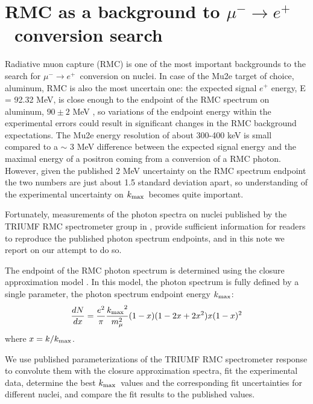 \documentclass[12pt]{article}
\newcommand {\kmax}         {\mbox{$k_{\rm max}$}}
\newcommand {\MuMinusEPlus} {\mbox{$\mu^- \rightarrow e^+$}}
\begin{document}
\section{ RMC as a background to \MuMinusEPlus\ conversion search }
% 
% 

Radiative muon capture (RMC) is one of the most important backgrounds to the search for
\MuMinusEPlus\ conversion on nuclei. In case of the Mu2e target of choice, aluminum,
RMC is also the most uncertain one: the expected signal $e^+$ energy, E = 92.32 MeV,
is close enough to the endpoint of the RMC spectrum on aluminum,
$90 \pm 2$ MeV \cite{RMC_1999_PhysRevC.59.2853}, so variations of the endpoint
energy within the experimental errors could result in significant changes
in the RMC background expectations.
%
The Mu2e energy resolution of about 300-400 keV
is small compared to a $\sim$ 3 MeV difference between the expected signal energy
and the maximal energy of a positron coming from a conversion of a RMC photon.
However, given the published 2 MeV uncertainty on the RMC spectrum endpoint the two 
numbers are just about 1.5 standard deviation apart, so understanding of the
experimental uncertainty on \kmax\ becomes quite important.

Fortunately, measurements of the photon spectra on nuclei published 
by the TRIUMF RMC spectrometer group in \cite{RMC_1992_PhysRevC.46.1094},
\cite{RMC_1999_PhysRevC.59.2853} provide sufficient information for readers
to reproduce the published photon spectrum endpoints, and in this note
we report on our attempt to do so.

The endpoint of the RMC photon spectrum is determined using the closure
approximation model \cite{RMC_1979_CERN_REF-TH-2967}.
In this model, the photon spectrum is fully defined by a single parameter,
the photon spectrum endpoint energy \kmax:
$$
   {dN \over dx} = {e^2 \over \pi} {\kmax^2 \over {m_\mu^2}}  (1-x) (1-2x+2x^2) x (1-x)^2
$$
where $x = k/\kmax$.

We use published parameterizations of the TRIUMF RMC spectrometer response
to convolute them with the closure approximation spectra, fit the experimental data,
determine the best \kmax\ values and the corresponding fit uncertainties
for different nuclei, and compare the fit results to the published values.
\end{document}
